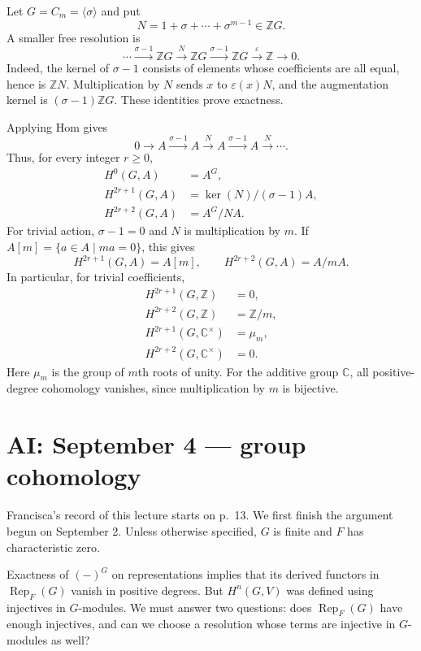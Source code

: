 \begin{example}
\label{example-ai-cyclic-sept-four}
Let $G=C_m=\langle\sigma\rangle$ and put
$$
N=1+\sigma+\cdots+\sigma^{m-1}
\in\mathbb{Z}G.
$$
A smaller free resolution is
$$
\cdots\xrightarrow{\sigma-1}\mathbb{Z}G
\xrightarrow{N}\mathbb{Z}G
\xrightarrow{\sigma-1}\mathbb{Z}G
\xrightarrow{\varepsilon}\mathbb{Z}\to0.
$$
Indeed, the kernel of $\sigma-1$ consists
of elements whose coefficients are all
equal, hence is $\mathbb{Z}N$.
Multiplication by $N$ sends $x$ to
$\varepsilon(x)N$, and the augmentation
kernel is $(\sigma-1)\mathbb{Z}G$.
These identities prove exactness.

Applying Hom gives
$$
0\to A\xrightarrow{\sigma-1}A
\xrightarrow{N}A
\xrightarrow{\sigma-1}A
\xrightarrow{N}\cdots.
$$
Thus, for every integer $r\geq0$,
$$
\begin{aligned}
H^0(G,A)&=A^G,\\
H^{2r+1}(G,A)&=\ker(N)/(\sigma-1)A,\\
H^{2r+2}(G,A)&=A^G/NA.
\end{aligned}
$$
For trivial action, $\sigma-1=0$ and
$N$ is multiplication by $m$. If
$A[m]=\{a\in A\mid ma=0\}$, this gives
$$
H^{2r+1}(G,A)=A[m],
\qquad H^{2r+2}(G,A)=A/mA.
$$
In particular, for trivial coefficients,
$$
\begin{aligned}
H^{2r+1}(G,\mathbb{Z})&=0,\\
H^{2r+2}(G,\mathbb{Z})&=\mathbb{Z}/m,\\
H^{2r+1}(G,\mathbb{C}^{\times})&=\mu_m,\\
H^{2r+2}(G,\mathbb{C}^{\times})&=0.
\end{aligned}
$$
Here $\mu_m$ is the group of $m$th roots
of unity. For the additive group
$\mathbb{C}$, all positive-degree
cohomology vanishes, since multiplication
by $m$ is bijective.
\end{example}

\section{AI: September 4 ---
group cohomology}
\label{section-group-cohomology-4-sept}

\noindent
Francisca's record of this lecture starts
on p.~13. We first finish the argument
begun on September 2. Unless otherwise
specified, $G$ is finite and $F$ has
characteristic zero.

\medskip\noindent
Exactness of $(-)^G$ on representations
implies that its derived functors in
$\operatorname{Rep}_F(G)$ vanish in
positive degrees. But $H^n(G,V)$ was
defined using injectives in $G$-modules.
We must answer two questions: does
$\operatorname{Rep}_F(G)$ have enough
injectives, and can we choose a resolution
whose terms are injective in $G$-modules
as well?

